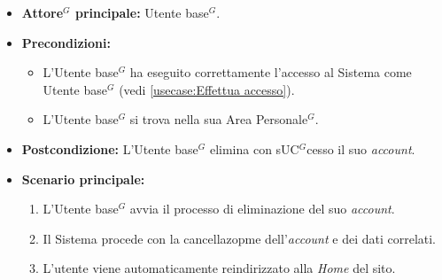 \label{usecase:Eliminazione account}
\begin{itemize}
	\item \textbf{\gls{Attore}$^G$ principale:} \gls{Utente base}$^G$.

	\item \textbf{Precondizioni:}
	      \begin{itemize}
		      \item L'\gls{Utente base}$^G$ ha eseguito correttamente l'accesso al Sistema come \gls{Utente base}$^G$ (vedi \autoref{usecase:Effettua accesso}).
		      \item L'\gls{Utente base}$^G$ si trova nella sua Area Personale$^G$.
	      \end{itemize}

	\item \textbf{Postcondizione:} L'\gls{Utente base}$^G$ elimina con s\gls{UC}$^G$cesso il suo \textit{account}.

	\item \textbf{Scenario principale:}
	      \begin{enumerate}
		      \item L'\gls{Utente base}$^G$ avvia il processo di eliminazione del suo \textit{account}.
		      \item Il Sistema procede con la cancellazopme dell'\textit{account} e dei dati correlati.
		      \item L'utente viene automaticamente reindirizzato alla \textit{Home} del sito.
	      \end{enumerate}
\end{itemize}
